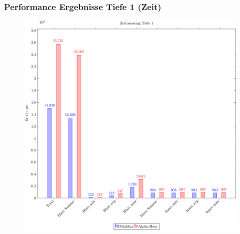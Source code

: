 \documentclass{beamer}
\begin{document}

\begin{frame}
\frametitle{Performance Ergebnisse Tiefe 1 (Zeit)}
  \begin{figure}
    \centering
    \includegraphics[scale=0.4]{figures/time-1.pdf}
  \end{figure}

\end{frame}

\end{document}
